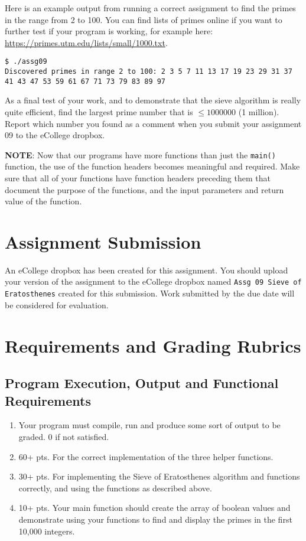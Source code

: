 \documentclass[11pt]{article}
\begin{document}
Here is an example output from running a correct assignment to find the
primes in the range from 2 to 100.  You can find lists of primes online
if you want to further test if your program is working, for example
here: \href{https://primes.utm.edu/lists/small/1000.txt}{https://primes.utm.edu/lists/small/1000.txt}.


\begin{verbatim}
$ ./assg09
Discovered primes in range 2 to 100: 2 3 5 7 11 13 17 19 23 29 31 37 41 43 47 53 59 61 67 71 73 79 83 89 97
\end{verbatim}

As a final test of your work, and to demonstrate that the sieve
algorithm is really quite efficient, find the largest prime number
that is $\le 1 000 000$ (1 million).  Report which number you found as
a comment when you submit your assignment 09 to the eCollege dropbox.

\textbf{NOTE}: Now that our programs have more functions than just the
\verb~main()~ function, the use of the function headers becomes meaningful
and required.  Make sure that all of your functions have function
headers preceding them that document the purpose of the functions, and
the input parameters and return value of the function.
\section*{Assignment Submission}
\label{sec-4}


An eCollege dropbox has been created for this assignment.  You should
upload your version of the assignment to the eCollege dropbox named
\verb~Assg 09 Sieve of Eratosthenes~ created for this submission.  Work
submitted by the due date will be considered for evaluation.
\section*{Requirements and Grading Rubrics}
\label{sec-5}
\subsection*{Program Execution, Output and Functional Requirements}
\label{sec-5-1}


\begin{enumerate}
\item Your program must compile, run and produce some sort of output to
   be graded. 0 if not satisfied.
\item 60+ pts. For the correct implementation of the three helper functions.
\item 30+ pts. For implementing the Sieve of Eratosthenes algorithm and functions
   correctly, and using the functions as described above.
\item 10+ pts. Your main function should create the array of boolean values
   and demonstrate using your functions to find and display the primes in
   the first 10,000 integers.
\end{enumerate}
\end{document}
